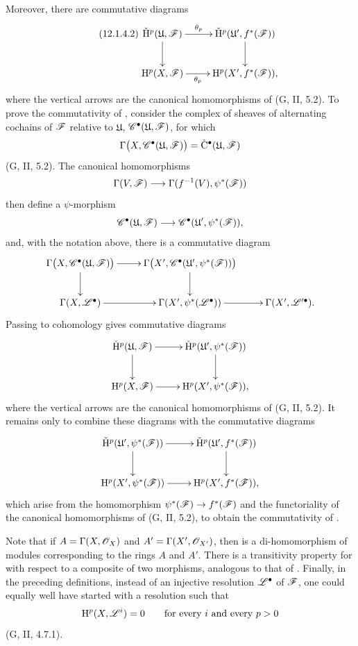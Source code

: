 \begin{env}[12.1.4]
Moreover, there are commutative diagrams
\[
\label{0.12.1.4.2}
\tag{12.1.4.2}
  \xymatrix{
    \check{\HH}^p(\mathfrak{U},\sh{F})
      \ar[r]^-{\theta_p}\ar[d]
      & \check{\HH}^p(\mathfrak{U}',f^*(\sh{F}))\ar[d]\\
    \HH^p(X,\sh{F})
      \ar[r]_-{\theta_p}
      & \HH^p(X',f^*(\sh{F})),
  }
\]
where the vertical arrows are the canonical homomorphisms of
(G, II, 5.2).
To prove the commutativity of , consider the complex
of sheaves of alternating cochains of $\mathscr{F}$ relative to
$\mathfrak{U}$,
$\mathscr{C}^\bullet(\mathfrak{U},\mathscr{F})$, for which
\[
  \Gamma\bigl(X,\mathscr{C}^\bullet(\mathfrak{U},\mathscr{F})\bigr)
  =
  \check{\mathrm{C}}^\bullet(\mathfrak{U},\mathscr{F})
\]
(G, II, 5.2).
The canonical homomorphisms
\[
  \Gamma(V,\mathscr{F})
  \longrightarrow
  \Gamma(f^{-1}(V),\psi^*(\mathscr{F}))
\]
then define a $\psi$-morphism
\[
  \mathscr{C}^\bullet(\mathfrak{U},\mathscr{F})
  \longrightarrow
  \mathscr{C}^\bullet(\mathfrak{U}',\psi^*(\mathscr{F})),
\]
and, with the notation above, there is a commutative diagram
\[
  \xymatrix{
    \Gamma\bigl(X,\sh{C}^\bullet(\mathfrak{U},\sh{F})\bigr)
      \ar[r]\ar[d]
      & \Gamma\bigl(X',
          \sh{C}^\bullet(\mathfrak{U}',\psi^*(\sh{F}))\bigr)\ar[d]\\
    \Gamma(X,\sh{L}^\bullet)\ar[r]
      & \Gamma(X',\psi^*(\sh{L}^\bullet))\ar[r]
      & \Gamma(X',\sh{L}'^\bullet).
  }
\]
Passing to cohomology gives commutative diagrams
\[
  \xymatrix{
    \check{\HH}^p(\mathfrak{U},\sh{F})\ar[r]\ar[d]
      & \check{\HH}^p(\mathfrak{U}',\psi^*(\sh{F}))\ar[d]\\
    \HH^p(X,\sh{F})\ar[r]
      & \HH^p(X',\psi^*(\sh{F})),
  }
\]
where the vertical arrows are the canonical homomorphisms of
(G, II, 5.2).
It remains only to combine these diagrams with the commutative diagrams
\[
  \xymatrix{
    \check{\HH}^p(\mathfrak{U}',\psi^*(\sh{F}))\ar[r]\ar[d]
      & \check{\HH}^p(\mathfrak{U}',f^*(\sh{F}))\ar[d]\\
    \HH^p(X',\psi^*(\sh{F}))\ar[r]
      & \HH^p(X',f^*(\sh{F})),
  }
\]
which arise from the homomorphism
$\psi^*(\mathscr{F})\to f^*(\mathscr{F})$ and the functoriality of the
canonical homomorphisms of (G, II, 5.2), to obtain the commutativity
of .

Note that if
$A=\Gamma(X,\mathscr{O}_X)$ and $A'=\Gamma(X',\mathscr{O}_{X'})$, then
 is a di-homomorphism of modules corresponding to
the rings $A$ and $A'$.
There is a transitivity property for  with respect
to a composite of two morphisms, analogous to that of
.
Finally, in the preceding definitions, instead of an injective
resolution $\mathscr{L}^\bullet$ of $\mathscr{F}$, one could equally well have
started with a resolution such that
\[
  \mathrm{H}^p(X,\mathscr{L}^i)=0
  \qquad\text{for every $i$ and every $p>0$}
\]
(G, II, 4.7.1).
\end{env}

